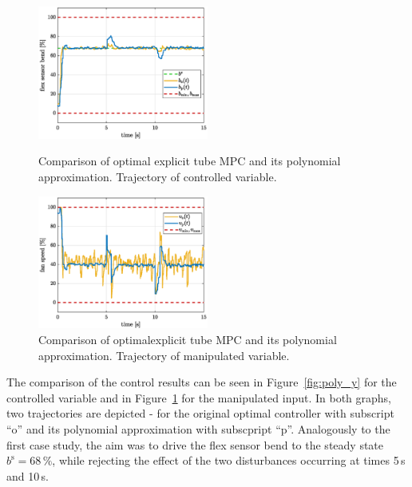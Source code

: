 \documentclass[letterpaper, 10 pt, conference]{ieeeconf}
\begin{document}
\begin{figure}[bp!]
	\begin{center}
		\includegraphics[width=0.5\textwidth]{images/poly_b.eps}
		\caption{Comparison of optimal explicit tube MPC and its polynomial approximation. Trajectory of controlled variable.}
		\label{fig:poly_y}
	\end{center}
	\begin{center}
		\includegraphics[width=0.5\textwidth]{images/poly_v.eps}
		\caption{Comparison of optimalexplicit tube MPC and its polynomial approximation. Trajectory of manipulated variable.}
		\label{fig:poly_u}
	\end{center}
\end{figure}


The comparison of the control results can be seen in Figure~\ref{fig:poly_y} for the controlled variable and in Figure~\ref{fig:poly_u} for the manipulated input. In both graphs, two trajectories are depicted - for the original optimal controller with subscript ``o'' and its polynomial approximation with subscpript ``p''. Analogously to the first case study, the aim was to drive the flex sensor bend to the steady state $ b^\mathrm{s} = 68\,\%$, while rejecting the effect of the two disturbances occurring at times 5\,s and 10\,s.
\end{document}
